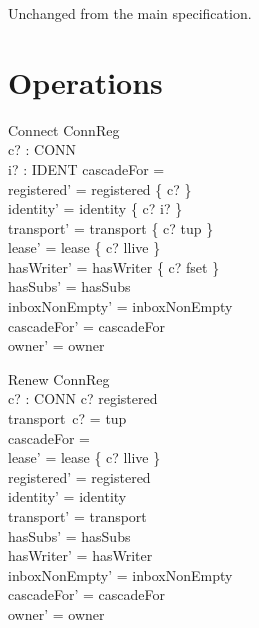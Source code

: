 \documentclass[a4paper,10pt,fleqn]{article}
\begin{document}
Unchanged from the main specification.

\section{Operations}

\begin{schema}{Connect}
  \Delta ConnReg \\
  c? : CONN \\
  i? : IDENT
\where
  cascadeFor = \emptyset \\
  registered' = registered \cup \{ c? \} \\
  identity' = identity \oplus \{ c? \mapsto i? \} \\
  transport' = transport \oplus \{ c? \mapsto tup \} \\
  lease' = lease \oplus \{ c? \mapsto llive \} \\
  hasWriter' = hasWriter \oplus \{ c? \mapsto fset \} \\
  hasSubs' = hasSubs \\
  inboxNonEmpty' = inboxNonEmpty \\
  cascadeFor' = cascadeFor \\
  owner' = owner
\end{schema}

\begin{schema}{Renew}
  \Delta ConnReg \\
  c? : CONN
\where
  c? \in registered \\
  transport~c? = tup \\
  cascadeFor = \emptyset \\
  lease' = lease \oplus \{ c? \mapsto llive \} \\
  registered' = registered \\
  identity' = identity \\
  transport' = transport \\
  hasSubs' = hasSubs \\
  hasWriter' = hasWriter \\
  inboxNonEmpty' = inboxNonEmpty \\
  cascadeFor' = cascadeFor \\
  owner' = owner
\end{schema}
\end{document}
